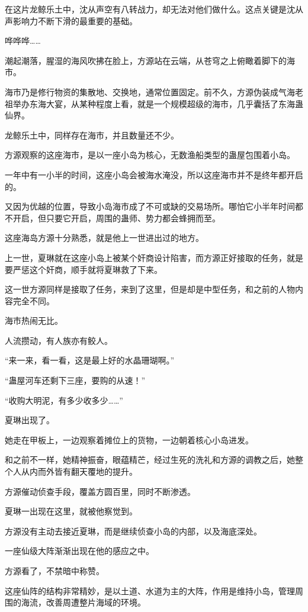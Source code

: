 \begin{this_body}
在这片龙鲸乐土中，沈从声空有八转战力，却无法对他们做什么。这点关键是沈从声影响力不断下滑的最重要的基础。

哗哗哗……

潮起潮落，腥湿的海风吹拂在脸上，方源站在云端，从苍穹之上俯瞰着脚下的海市。

海市乃是修行物资的集散地、交换地，通常位置固定。前不久，方源伪装成气海老祖举办东海大宴，从某种程度上看，就是一个规模超级的海市，几乎囊括了东海蛊仙界。

龙鲸乐土中，同样存在海市，并且数量还不少。

方源观察的这座海市，是以一座小岛为核心，无数渔船类型的蛊屋包围着小岛。

一年中有一小半的时间，这座小岛会被海水淹没，所以这座海市并不是终年都开启的。

又因为优越的位置，导致小岛海市成了不可或缺的交易场所。哪怕它小半年时间都不开启，但只要它开启，周围的蛊师、势力都会蜂拥而至。

这座海岛方源十分熟悉，就是他上一世进出过的地方。

上一世，夏琳就在这座小岛上被某个奸商设计陷害，而方源正好接取的任务，就是要严惩这个奸商，顺手就将夏琳救了下来。

这一世方源同样是接取了任务，来到了这里，但是却是中型任务，和之前的人物内容完全不同。

海市热闹无比。

人流攒动，有人族亦有鲛人。

“来一来，看一看，这是最上好的水晶珊瑚啊。”

“蛊屋河车还剩下三座，要购的从速！”

“收购大明泥，有多少收多少……”

夏琳出现了。

她走在甲板上，一边观察着摊位上的货物，一边朝着核心小岛进发。

和之前不一样，她精神振奋，眼蕴精芒，经过生死的洗礼和方源的调教之后，她整个人从内而外皆有翻天覆地的提升。

方源催动侦查手段，覆盖方圆百里，同时不断渗透。

夏琳一出现在这里，就被他察觉到。

方源没有主动去接近夏琳，而是继续侦查小岛的内部，以及海底深处。

一座仙级大阵渐渐出现在他的感应之中。

方源看了，不禁暗中称赞。

这座仙阵的结构非常精妙，是以土道、水道为主的大阵，作用是维持小岛，管理周围的海流，改善周遭整片海域的环境。


\end{this_body}
